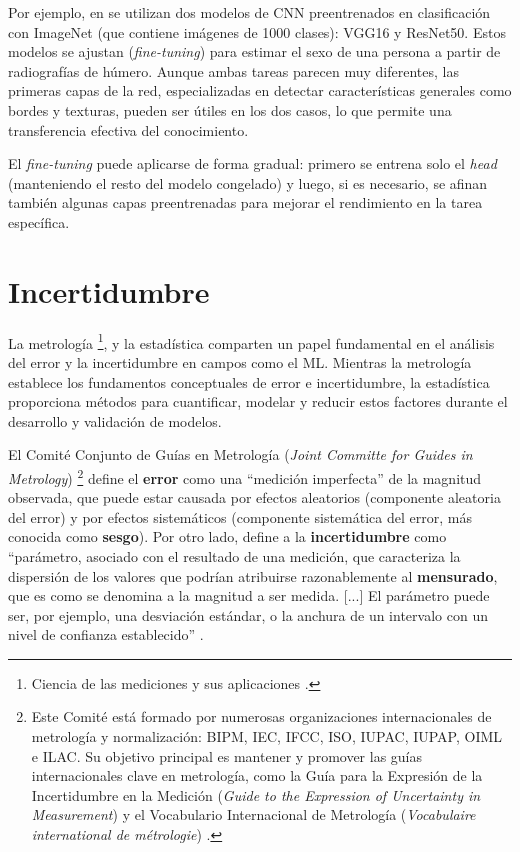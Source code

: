 Por ejemplo, en \cite{venema2022} se utilizan dos modelos de CNN preentrenados en clasificación con ImageNet 
(que contiene imágenes de 1000 clases): VGG16 y ResNet50. Estos modelos se ajustan (\textit{fine-tuning}) 
para estimar el sexo de una persona a partir de radiografías de húmero. Aunque ambas tareas parecen muy 
diferentes, las primeras capas de la red, especializadas en detectar características generales como bordes y 
texturas, pueden ser útiles en los dos casos, lo que permite una transferencia efectiva del conocimiento.

El \textit{fine-tuning} puede aplicarse de forma gradual: primero se entrena solo el \textit{head} 
(manteniendo el resto del modelo congelado) y luego, si es necesario, se afinan también algunas capas 
preentrenadas para mejorar el rendimiento en la tarea específica.



\section{Incertidumbre}

La metrología
\footnote{
    Ciencia de las mediciones y sus aplicaciones \cite{jcgm200:2012}.
},
y la estadística comparten un papel fundamental en el análisis del error y la incertidumbre en campos como 
el ML. Mientras la metrología establece los fundamentos conceptuales de error e incertidumbre, la estadística 
proporciona métodos para cuantificar, modelar y reducir estos factores durante el desarrollo y validación de 
modelos.

El Comité Conjunto de Guías en Metrología (\textit{Joint Committe for Guides in Metrology})
\footnote{
    Este Comité está formado por numerosas organizaciones internacionales de metrología y normalización: 
    BIPM, IEC, IFCC, ISO, IUPAC, IUPAP, OIML e ILAC. Su objetivo principal es mantener y promover las 
    guías internacionales clave en metrología, como la Guía para la Expresión de la Incertidumbre en la 
    Medición (\textit{Guide to the Expression of Uncertainty in Measurement}) \cite{jcgm100:2008} y el 
    Vocabulario Internacional de Metrología (\textit{Vocabulaire international de métrologie}) 
    \cite{jcgm200:2012}.
}
define el \textbf{error} como una ``medición imperfecta'' de la magnitud observada, que puede estar causada
por efectos aleatorios (componente aleatoria del error) y por efectos sistemáticos (componente sistemática del 
error, más conocida como \textbf{sesgo}).
Por otro lado, define a la \textbf{incertidumbre} como ``parámetro, asociado con el resultado de una medición, 
que caracteriza la dispersión de los valores que podrían atribuirse razonablemente al \textbf{mensurado}, que
es como se denomina a la magnitud a ser medida. [...] El parámetro puede ser, por ejemplo, una desviación 
estándar, o la anchura de un intervalo con un nivel de confianza establecido'' \cite{jcgm100:2008}.

